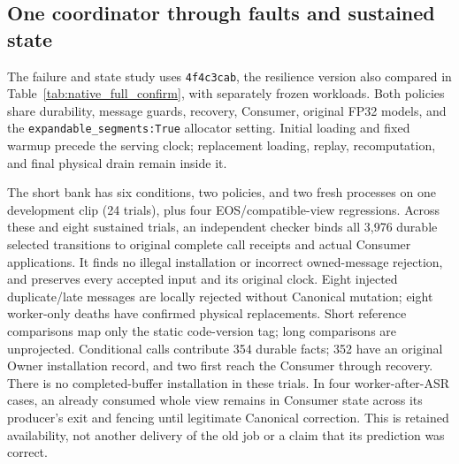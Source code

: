 \subsection{One coordinator through faults and sustained state}
\label{subsec:same_source_validation}
The failure and state study uses \texttt{4f4c3cab}, the resilience version
also compared in Table~\ref{tab:native_full_confirm}, with separately
frozen workloads. Both policies share durability,
message guards, recovery, Consumer, original FP32 models, and the
\texttt{expandable\_segments:True} allocator setting. Initial loading and
fixed warmup precede the serving clock; replacement loading, replay,
recomputation, and final physical drain remain inside it.

The short bank has six conditions, two policies, and two fresh processes
on one development clip (24 trials), plus four EOS/compatible-view
regressions. Across these and eight sustained trials, an independent
checker binds all 3,976 durable selected transitions to original complete
call receipts and actual Consumer applications. It finds no illegal
installation or incorrect owned-message rejection, and preserves every
accepted input and its original clock. Eight injected duplicate/late
messages are locally rejected without Canonical mutation; eight
worker-only deaths have confirmed physical replacements. Short reference
comparisons map only the static code-version tag; long comparisons are
unprojected. Conditional calls contribute 354 durable facts; 352 have
an original Owner installation record, and two first reach the Consumer
through recovery. There is no completed-buffer installation in these trials.
In four worker-after-ASR cases, an already consumed whole view remains
in Consumer state across its producer's exit and fencing until legitimate
Canonical correction. This is retained availability, not another delivery
of the old job or a claim that its prediction was correct.

\begin{table}[t]
\centering
\caption{Same-source short fault study: six conditions on the fixed
development clip, two fresh trials per policy. Each cell lists
Conservative above Full-call; ranges are observed minima and maxima,
not confidence intervals. Illegal; done gives illegal installations and
completed/2 trials. Reject/mutation counts local rejections and resulting
Canonical changes. New result measures fault to actual certified
consumption of a new durable fact whose original call completes after
the fault; it excludes old-fact replay and replacement readiness.
D2/C8 counts joint whole-run passes; EOS counts D2 misses. Both-board
energy spans the original serving clock through physical drain.}
\label{tab:native_reliability}
\begingroup
\fontsize{8.5}{10}\selectfont
\setlength{\tabcolsep}{3pt}

\endgroup
\end{table}

